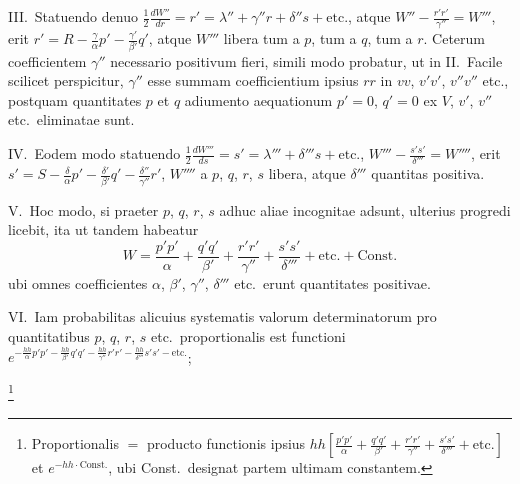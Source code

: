 \documentclass[11pt,a4paper]{article}
\begin{document}
III.\ Statuendo denuo $\frac{1}{2}\frac{dW''}{dr} = r' = \lambda'' + \gamma''r + \delta''s + \text{etc.}$, atque $W'' - \frac{r'r'}{\gamma''} = W'''$, erit $r' = R - \frac{\gamma}{\alpha}p' - \frac{\gamma'}{\beta'}q'$, atque $W'''$ libera tum a $p$, tum a $q$, tum a $r$. Ceterum coefficientem $\gamma''$ necessario positivum fieri, simili modo probatur, ut in II.\ Facile scilicet perspicitur, $\gamma''$ esse summam coefficientium ipsius $rr$ in $vv$, $v'v'$, $v''v''$ etc., postquam quantitates $p$ et $q$ adiumento aequationum $p' = 0$, $q' = 0$ ex $V$, $v'$, $v''$ etc.\ eliminatae sunt.

\newpage
\setcounter{page}{256}

IV.\ Eodem modo statuendo $\frac{1}{2}\frac{dW'''}{ds} = s' = \lambda''' + \delta'''s + \text{etc.}$, $W''' - \frac{s's'}{\delta'''} = W''''$, erit $s' = S - \frac{\delta}{\alpha}p' - \frac{\delta'}{\beta'}q' - \frac{\delta''}{\gamma''}r'$, $W''''$ a $p$, $q$, $r$, $s$ libera, atque $\delta'''$ quantitas positiva.

V.\ Hoc modo, si praeter $p$, $q$, $r$, $s$ adhuc aliae incognitae adsunt, ulterius progredi licebit, ita ut tandem habeatur
\[
W = \frac{p'p'}{\alpha} + \frac{q'q'}{\beta'} + \frac{r'r'}{\gamma''} + \frac{s's'}{\delta'''} + \text{etc.} + \text{Const.}
\]
ubi omnes coefficientes $\alpha$, $\beta'$, $\gamma''$, $\delta'''$ etc.\ erunt quantitates positivae.

VI.\ Iam probabilitas alicuius systematis valorum determinatorum pro quantitatibus $p$, $q$, $r$, $s$ etc.\ proportionalis est functioni $e^{-\frac{hh}{\alpha}p'p' - \frac{hh}{\beta'}q'q' - \frac{hh}{\gamma''}r'r' - \frac{hh}{\delta'''}s's' - \text{etc.}}$;

\footnote{Proportionalis $=$ producto functionis ipsius $hh[\frac{p'p'}{\alpha} + \frac{q'q'}{\beta'} + \frac{r'r'}{\gamma''} + \frac{s's'}{\delta'''} + \text{etc.}]$ et $e^{-hh\cdot\text{Const.}}$, ubi Const.\ designat partem ultimam constantem.}
\end{document}
